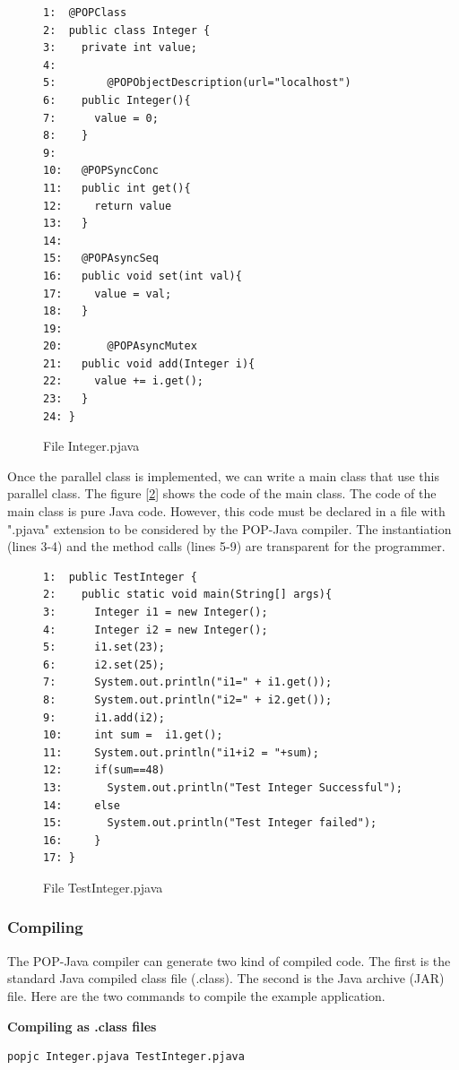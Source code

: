 \begin{figure}[ht]
\caption{File Integer.pjava}
\label{fig:code_integer.pjava}
\begin{lstlisting}
1:  @POPClass
2:  public class Integer {
3:    private int value;
4:	
5:        @POPObjectDescription(url="localhost")
6:	  public Integer(){
7:	    value = 0;	
8: 	  }
9: 	
10:	  @POPSyncConc
11:	  public int get(){
12:	    return value	
13:	  }
14:	
15:	  @POPAsyncSeq
16:	  public void set(int val){
17:	    value = val;	
18:	  }
19:	
20:       @POPAsyncMutex
21:	  public void add(Integer i){
22:	    value += i.get();	
23:	  }
24:	}
\end{lstlisting}
\end{figure}

\pagebreak
Once the parallel class is implemented, we can write a main class that use this parallel class.
The figure [\ref{fig:code_testinteger.pjava}] shows the code of the main class. The code of the main class is pure Java code.
However, this code must be declared in a file with ".pjava" extension to be considered by the POP-Java compiler.
The instantiation (lines 3-4) and the method calls (lines 5-9) are transparent for the programmer.

\begin{figure}[ht]
\caption{File TestInteger.pjava}
\label{fig:code_testinteger.pjava}
\begin{lstlisting}
1: 	public TestInteger {
2: 	  public static void main(String[] args){
3:	    Integer i1 = new Integer();
4:	    Integer i2 = new Integer();
5:	    i1.set(23);
6:	    i2.set(25);
7:	    System.out.println("i1=" + i1.get());
8:	    System.out.println("i2=" + i2.get());
9:	    i1.add(i2);
10:	    int sum =  i1.get();
11:	    System.out.println("i1+i2 = "+sum);
12:	    if(sum==48)
13:	      System.out.println("Test Integer Successful");
14:	    else
15:	      System.out.println("Test Integer failed");
16:	    }
17:	}
\end{lstlisting}
\end{figure}


\subsubsection{Compiling}
The POP-Java compiler can generate two kind of compiled code. The first is the standard Java compiled class file (.class). The second is the Java archive (JAR) file. Here are the two commands to compile the example application.\s

\textbf{Compiling as .class files}
\begin{lstlisting}
popjc Integer.pjava TestInteger.pjava
\end{lstlisting}\s

